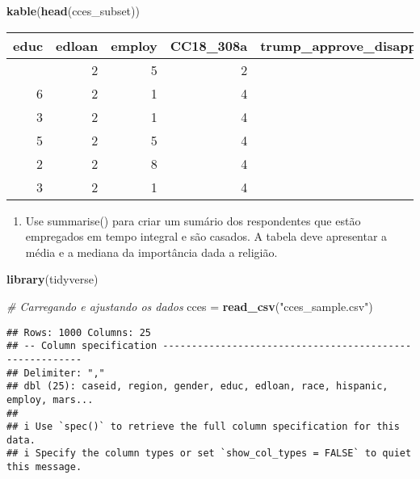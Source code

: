 \documentclass[
]{article}
\newenvironment{Shaded}{\begin{snugshade}}{\end{snugshade}}
\newcommand{\CommentTok}[1]{\textcolor[rgb]{0.56,0.35,0.01}{\textit{#1}}}
\newcommand{\FunctionTok}[1]{\textcolor[rgb]{0.13,0.29,0.53}{\textbf{#1}}}
\newcommand{\NormalTok}[1]{#1}
\newcommand{\OtherTok}[1]{\textcolor[rgb]{0.56,0.35,0.01}{#1}}
\newcommand{\StringTok}[1]{\textcolor[rgb]{0.31,0.60,0.02}{#1}}
\providecommand{\tightlist}{%
  \setlength{\itemsep}{0pt}\setlength{\parskip}{0pt}}
\begin{document}
\begin{Shaded}
\begin{Highlighting}[]
\FunctionTok{kable}\NormalTok{(}\FunctionTok{head}\NormalTok{(cces\_subset))}
\end{Highlighting}
\end{Shaded}

\begin{longtable}[]{@{}rrrrr@{}}
\toprule\noalign{}
educ & edloan & employ & CC18\_308a & trump\_approve\_disapprove \\
\midrule\noalign{}
\endhead
\bottomrule\noalign{}
\endlastfoot
2 & 2 & 5 & 2 & 1 \\
6 & 2 & 1 & 4 & 0 \\
3 & 2 & 1 & 4 & 0 \\
5 & 2 & 5 & 4 & 0 \\
2 & 2 & 8 & 4 & 0 \\
3 & 2 & 1 & 4 & 0 \\
\end{longtable}

\begin{enumerate}
\def\labelenumi{\arabic{enumi})}
\setcounter{enumi}{2}
\tightlist
\item
  Use summarise() para criar um sumário dos respondentes que estão
  empregados em tempo integral e são casados. A tabela deve apresentar a
  média e a mediana da importância dada a religião.
\end{enumerate}

\begin{Shaded}
\begin{Highlighting}[]
\FunctionTok{library}\NormalTok{(tidyverse)}

\CommentTok{\# Carregando e ajustando os dados}
\NormalTok{cces }\OtherTok{=} \FunctionTok{read\_csv}\NormalTok{(}\StringTok{"cces\_sample.csv"}\NormalTok{)}
\end{Highlighting}
\end{Shaded}

\begin{verbatim}
## Rows: 1000 Columns: 25
## -- Column specification --------------------------------------------------------
## Delimiter: ","
## dbl (25): caseid, region, gender, educ, edloan, race, hispanic, employ, mars...
## 
## i Use `spec()` to retrieve the full column specification for this data.
## i Specify the column types or set `show_col_types = FALSE` to quiet this message.
\end{verbatim}
\end{document}

